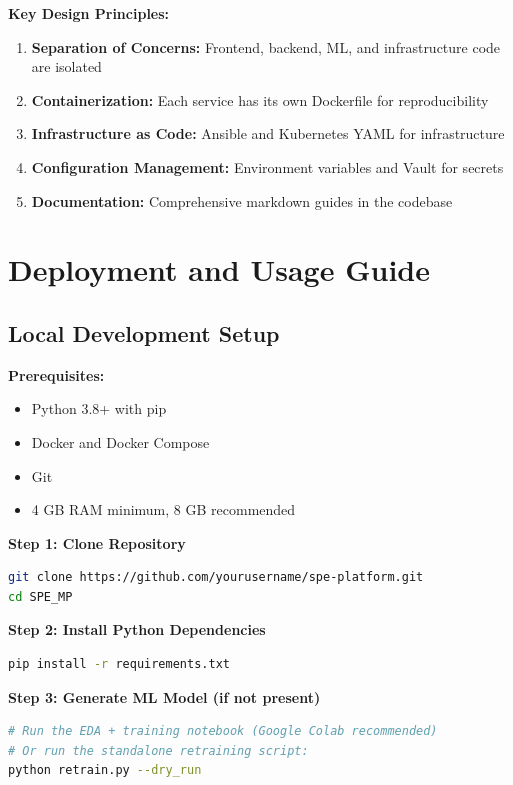 \documentclass[12pt,a4paper]{report}
\begin{document}
\textbf{Key Design Principles:}
\begin{enumerate}[leftmargin=2em]
    \item \textbf{Separation of Concerns:} Frontend, backend, ML, and infrastructure code are isolated
    \item \textbf{Containerization:} Each service has its own Dockerfile for reproducibility
    \item \textbf{Infrastructure as Code:} Ansible and Kubernetes YAML for infrastructure
    \item \textbf{Configuration Management:} Environment variables and Vault for secrets
    \item \textbf{Documentation:} Comprehensive markdown guides in the codebase
\end{enumerate}

\chapter{Deployment and Usage Guide}

\section{Local Development Setup}

\textbf{Prerequisites:}
\begin{itemize}[leftmargin=2em]
    \item Python 3.8+ with pip
    \item Docker and Docker Compose
    \item Git
    \item 4 GB RAM minimum, 8 GB recommended
\end{itemize}

\textbf{Step 1: Clone Repository}
\begin{lstlisting}[language=bash]
git clone https://github.com/yourusername/spe-platform.git
cd SPE_MP
\end{lstlisting}

\textbf{Step 2: Install Python Dependencies}
\begin{lstlisting}[language=bash]
pip install -r requirements.txt
\end{lstlisting}

\textbf{Step 3: Generate ML Model (if not present)}
\begin{lstlisting}[language=bash]
# Run the EDA + training notebook (Google Colab recommended)
# Or run the standalone retraining script:
python retrain.py --dry_run
\end{lstlisting}
\end{document}
